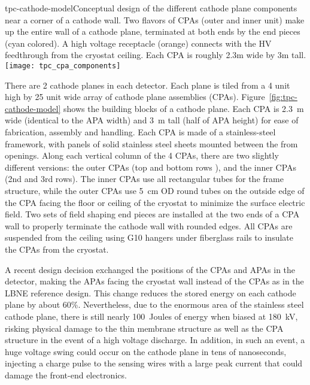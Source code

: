 \begin{cdrfigure}{tpc-cathode-model}{Conceptual design of the different cathode plane components near a corner of a cathode wall.  Two flavors of CPAs (outer and inner unit) make up the entire wall of a cathode plane, terminated at both ends by the end pieces (cyan colored).  A high voltage receptacle (orange) connects with the HV feedthrough from the cryostat ceiling. Each CPA is roughly 2.3m wide by 3m tall.}
\texttt{[image: tpc\_cpa\_components]}
\end{cdrfigure}

There are 2 cathode planes in each detector.  Each plane is tiled from a 4 unit high by 25 unit wide array of cathode plane assemblies (CPAs). Figure~\ref{fig:tpc-cathode-model} shows the building blocks of a cathode plane.  Each CPA is 2.3~m wide (identical to the APA width) and 3~m tall (half of APA height) for ease of fabrication, assembly and handling.  Each CPA is made of a stainless-steel framework, with panels of solid stainless steel sheets mounted between the from openings.  Along each vertical  column of the 4 CPAs, there are two slightly different versions: the outer CPAs (top and bottom rows ), and the inner CPAs (2nd and 3rd rows).  The inner CPAs use all rectangular tubes for the frame structure, while the outer CPAs use 5~cm OD round tubes on the outside edge of the CPA facing the floor or ceiling of the cryostat to minimize the surface electric field.  Two sets of field shaping end pieces are installed at the two ends of a CPA wall to properly terminate the cathode wall with rounded edges.  All CPAs are suspended from the ceiling using G10 hangers under fiberglass rails to insulate the CPAs from the cryostat.

A recent design decision exchanged the positions of the CPAs and APAs in the detector, making the APAs facing the cryostat wall instead of the CPAs as in the LBNE reference design.  This change reduces the stored energy on each cathode plane by about 60\%.  Nevertheless, due to the enormous area of the stainless steel cathode plane, there is still nearly 100~Joules of energy when biased at 180~kV, risking physical damage to the thin membrane structure as well as the CPA structure in the event of a high voltage discharge.  In addition, in such an event, a huge voltage swing could occur on the cathode plane in tens of nanoseconds, injecting a  charge pulse to the sensing wires with a large peak current that could damage the front-end electronics.

